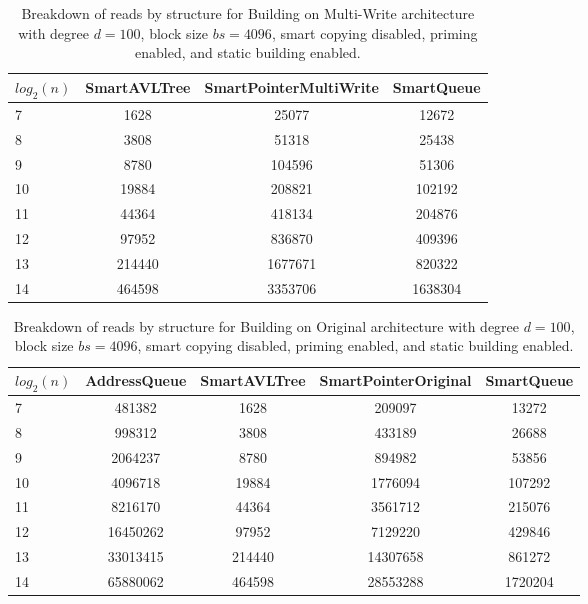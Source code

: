 \begin{table}[]
\centering
\begin{tabular}{|l|c|c|c|}
$log_2(n)$ & SmartAVLTree & SmartPointerMultiWrite & SmartQueue \\ \hline
7 & 1628 & 25077 & 12672 \\ \hline
8 & 3808 & 51318 & 25438 \\ \hline
9 & 8780 & 104596 & 51306 \\ \hline
10 & 19884 & 208821 & 102192 \\ \hline
11 & 44364 & 418134 & 204876 \\ \hline
12 & 97952 & 836870 & 409396 \\ \hline
13 & 214440 & 1677671 & 820322 \\ \hline
14 & 464598 & 3353706 & 1638304 \\ \hline
\end{tabular}
\caption{Breakdown of reads by structure for Building on Multi-Write architecture with degree $d=100$, block size $bs=4096$, smart copying disabled, priming enabled, and static building enabled.}
    \label{tab:reads_by_structure_build_d100_bs4096_copiesfalse_primetrue_staticinsertiontrue_ptmultiwrite_movetrue}
\end{table}

\begin{table}[]
\centering
\begin{tabular}{|l|c|c|c|c|}
$log_2(n)$ & AddressQueue & SmartAVLTree & SmartPointerOriginal & SmartQueue \\ \hline
7 & 481382 & 1628 & 209097 & 13272 \\ \hline
8 & 998312 & 3808 & 433189 & 26688 \\ \hline
9 & 2064237 & 8780 & 894982 & 53856 \\ \hline
10 & 4096718 & 19884 & 1776094 & 107292 \\ \hline
11 & 8216170 & 44364 & 3561712 & 215076 \\ \hline
12 & 16450262 & 97952 & 7129220 & 429846 \\ \hline
13 & 33013415 & 214440 & 14307658 & 861272 \\ \hline
14 & 65880062 & 464598 & 28553288 & 1720204 \\ \hline
\end{tabular}
\caption{Breakdown of reads by structure for Building on Original architecture with degree $d=100$, block size $bs=4096$, smart copying disabled, priming enabled, and static building enabled.}
    \label{tab:reads_by_structure_build_d100_bs4096_copiesfalse_primetrue_staticinsertiontrue_ptoriginal_movefalse}
\end{table}

